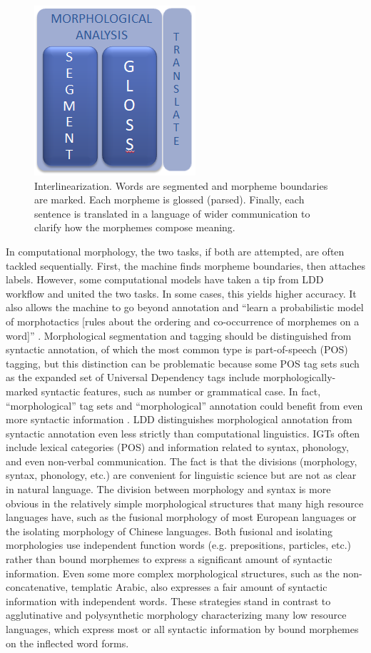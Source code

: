 \documentclass[12pt]{article}
\begin{document}
\begin{figure}[ht]
\begin{center}
\includegraphics[width=0.3\columnwidth]{IGT.PNG}
\caption{Interlinearization. Words are segmented and morpheme boundaries are marked. Each morpheme is glossed (parsed). Finally, each sentence is translated in a language of wider communication to clarify how the morphemes compose meaning.}
\label{fig:IGT}
\end{center}
\end{figure}
 
In computational morphology, the two tasks, if both are attempted, are often tackled sequentially. First, the machine finds morpheme boundaries, then attaches labels. However, some computational models have taken a tip from LDD workflow and united the two tasks. In some cases, this yields higher accuracy. It also allows the machine to go beyond annotation and ``learn a probabilistic model of morphotactics [rules about the ordering and co-occurrence of morphemes on a word]'' \cite[page 165]{cotterell_labeled_2015}.
Morphological segmentation and tagging should be distinguished from syntactic annotation, of which the most common type is part-of-speech (POS) tagging, but this distinction can be problematic because some POS tag sets such as the expanded set of Universal Dependency tags \cite{de_marneffe_universal_2014} include morphologically-marked syntactic features, such as number or grammatical case. In fact, ``morphological'' tag sets and ``morphological'' annotation could benefit from even more syntactic information \cite{cotterell_cross-lingual_2017}. LDD distinguishes morphological annotation from syntactic annotation even less strictly than computational linguistics. IGTs often include lexical categories (POS) and information related to syntax, phonology, and even non-verbal communication. The fact is that the divisions (morphology, syntax, phonology, etc.) are convenient for linguistic science but are not as clear in natural language. The division between morphology and syntax is more obvious in the relatively simple morphological structures that many high resource languages have, such as the fusional morphology of most European languages or the isolating morphology of Chinese languages. Both fusional and isolating morphologies use independent function words (e.g. prepositions, particles, etc.) rather than bound morphemes to express a significant amount of syntactic information. Even some more complex morphological structures, such as the non-concatenative, templatic Arabic, also expresses a fair amount of syntactic information with independent words. These strategies stand in contrast to agglutinative and polysynthetic morphology characterizing many low resource languages, which express most or all syntactic information by bound morphemes on the inflected word forms. 
\end{document}
